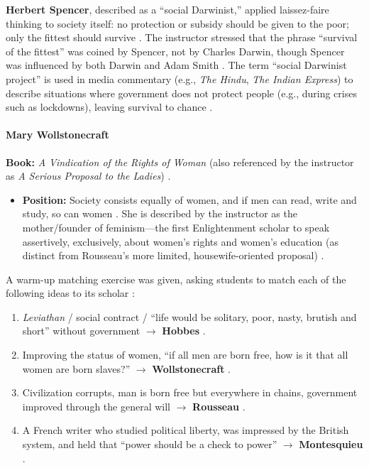 \begin{CriticalPoint}
\textbf{Herbert Spencer}, described as a ``social Darwinist,'' applied laissez-faire thinking to society itself: no protection or subsidy should be given to the poor; only the fittest should survive . The instructor stressed that the phrase ``survival of the fittest'' was coined by Spencer, not by Charles Darwin, though Spencer was influenced by both Darwin and Adam Smith . The term ``social Darwinist project'' is used in media commentary (e.g., \textit{The Hindu}, \textit{The Indian Express}) to describe situations where government does not protect people (e.g., during crises such as lockdowns), leaving survival to chance .
\end{CriticalPoint}

\paragraph{Mary Wollstonecraft}
\begin{KeyConcept}
\textbf{Book:} \textit{A Vindication of the Rights of Woman} (also referenced by the instructor as \textit{A Serious Proposal to the Ladies}) .
\begin{itemize}
    \item \textbf{Position:} Society consists equally of women, and if men can read, write and study, so can women . She is described by the instructor as the mother/founder of feminism---the first Enlightenment scholar to speak assertively, exclusively, about women's rights and women's education (as distinct from Rousseau's more limited, housewife-oriented proposal) .
\end{itemize}
\end{KeyConcept}

\begin{PYQLink}
A warm-up matching exercise was given, asking students to match each of the following ideas to its scholar :
\begin{enumerate}[label=(\roman*)]
    \item \textit{Leviathan} / social contract / ``life would be solitary, poor, nasty, brutish and short'' without government $\longrightarrow$ \textbf{Hobbes} .
    \item Improving the status of women, ``if all men are born free, how is it that all women are born slaves?'' $\longrightarrow$ \textbf{Wollstonecraft} .
    \item Civilization corrupts, man is born free but everywhere in chains, government improved through the general will $\longrightarrow$ \textbf{Rousseau} .
    \item A French writer who studied political liberty, was impressed by the British system, and held that ``power should be a check to power'' $\longrightarrow$ \textbf{Montesquieu} .
\end{enumerate}
\end{PYQLink}

